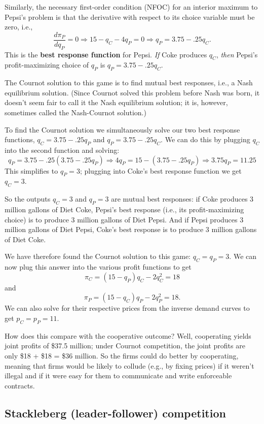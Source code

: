 Similarly, the necessary first-order condition (NFOC) for an interior maximum to Pepsi's problem is that the derivative with respect to its choice variable must be zero, i.e.,
\[
\frac{d\pi_P}{d q_P}=0\Longrightarrow 15-q_C-4q_P=0\Longrightarrow q_P=3.75-.25q_C.
\]
This is the \textbf{best response function} for Pepsi. \emph{If} Coke produces $q_C$, \emph{then} Pepsi's profit-maximizing choice of $q_P$ is $q_P=3.75-.25q_C$.

The Cournot solution to this game is to find mutual best responses, i.e., a Nash equilibrium solution. (Since Cournot solved this problem before Nash was born, it doesn't seem fair to call it the Nash equilibrium solution; it is, however, sometimes called the Nash-Cournot solution.)

To find the Cournot solution we simultaneously solve our two best response functions, $q_C=3.75-.25q_P$ and $q_P=3.75-.25q_C$. We can do this by plugging $q_C$ into the second function and solving:
\[
q_P=3.75-.25(3.75-.25q_P)\Longrightarrow 4q_P=15-(3.75-.25q_P)\Longrightarrow 3.75q_P=11.25
\]
This simplifies to $q_P=3$; plugging into Coke's best response function we get $q_C=3$.

So the outputs $q_C=3$ and $q_P=3$ are mutual best responses: if Coke produces 3 million gallons of Diet Coke, Pepsi's best response (i.e., its profit-maximizing choice) is to produce 3 million gallons of Diet Pepsi. And if Pepsi produces 3 million gallons of Diet Pepsi, Coke's best response is to produce 3 million gallons of Diet Coke.

We have therefore found the Cournot solution to this game: $q_C=q_P=3$. We can now plug this answer into the various profit functions to get
\[
\pi_C=(15-q_P)q_C - 2 q_C^2=18
\]
and
\[
\pi_P=(15-q_C)q_P - 2 q_P^2=18.
\]
We can also solve for their respective prices from the inverse demand curves to get $p_C=p_P=11.$

How does this compare with the cooperative outcome? Well, cooperating yields joint profits of \$37.5 million; under Cournot competition, the joint profits are only \$18 + \$18 = \$36 million. So the firms could do better by cooperating, meaning that firms would be likely to collude (e.g., by fixing prices) if it weren't illegal and if it were easy for them to communicate and write enforceable contracts.





\subsection*{Stackleberg (leader-follower) competition}

